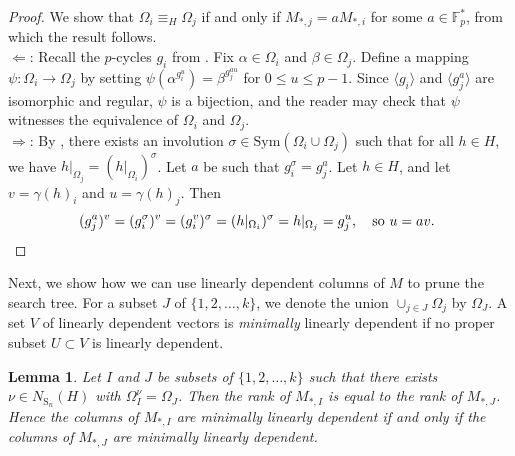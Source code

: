 \documentclass[11pt,a4paper]{article}
\newtheorem{lemma}[theorem]{Lemma}
\theoremstyle{definition}
\theoremstyle{remark}
\newcommand{\Sym}[0]{\mathrm{Sym}}
\newcommand{\Sy}{\mathrm{S}}
\begin{document}
\begin{proof}
We show that $\Omega_i \equiv_H \Omega_j$ if and only if $M_{*,j} = aM_{*,i}$ for some $a \in \mathds{F}_p^*$, from which the result follows.   \\
$\Leftarrow$: 
Recall the $p$-cycles $g_i$ from .
Fix $\alpha \in \Omega_i$ and $\beta \in \Omega_j$.
Define a mapping $\psi : \Omega_i \rightarrow \Omega_j$ by 
setting 
$\psi(\alpha^{g_i^u}) = \beta^{g_j^{au}}$ for $0 \leq u \leq {p-1}$.
Since $\langle g_i \rangle$ and $ \langle g_j^a \rangle$ are isomorphic and regular, $\psi$ is a bijection, and the reader may check that $\psi$ witnesses the equivalence of $\Omega_i$ and $\Omega_j$.\\
$\Rightarrow$: 
By , there exists an involution $\sigma \in \Sym(\Omega_i \cup \Omega_j)$ such that for all $h \in H$, we have $h|_{\Omega_j} = (h|_{\Omega_i})^{\sigma}$.
Let $a$ be such that $g_i^\sigma = g_j^a$. 
Let $h \in H$, and let $v = \gamma(h)_i$ and $u=\gamma(h)_j$. 
Then 
\[(g_j^a)^{v} = (g_i^\sigma)^{v} = (g_i^{v})^\sigma= (h|_{\Omega_i})^\sigma = h|_{\Omega_j} = g_j^{u}, \quad \text{so $u = av$. } \qedhere \] 
\end{proof}





Next, we show how we can use linearly dependent columns of $M$ to prune the search tree.
For a subset $J$ of $\{1,2, \ldots, k\}$, we denote the union $\cup_{j \in J} \Omega_j$ by $\Omega_J$. 
A set $V$ of linearly dependent vectors is \emph{minimally} linearly dependent if no proper subset $U \subset V$ is linearly dependent. 

\begin{lemma} \label{norm maps lin dep to lin dep} \label{indep or mindep by isom}\label{min lin dep to min lin dep} 
Let $I$ and $J$ be subsets of $\{1,2, \ldots, k\}$ such that there exists $\nu \in N_{\Sy_n}(H)$ with $\Omega_I^\nu = \Omega_J$. 
Then the rank of $M_{*,I}$ is equal to the rank of $M_{*,J}$. 
Hence the columns of $M_{*,I}$ are minimally linearly dependent if and only if the columns of $M_{*,J}$ are minimally linearly dependent. 
\end{lemma}
\end{document}
